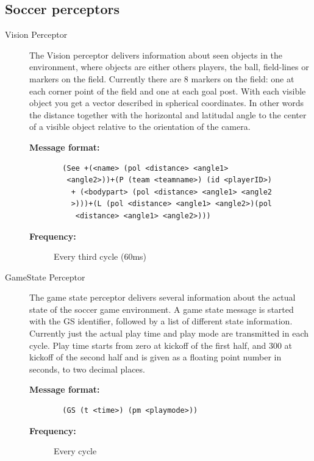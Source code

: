 \subsection{Soccer perceptors}
\begin{description}
  \item [Vision Perceptor]
  The Vision perceptor delivers information about seen objects in the environment, where objects are either others players, the ball, field-lines or markers on the field. Currently there are 8 markers on the field: one at each corner point of the field and one at each goal post. With each visible object you get a vector described in spherical coordinates. In other words the distance together with the horizontal and latitudal angle to the center of a visible object relative to the orientation of the camera.\cite{SimSpark}
 \begin{description}
  \item[{\bf Message format:}]
  \begin{verbatim}
  (See +(<name> (pol <distance> <angle1>
   <angle2>))+(P (team <teamname>) (id <playerID>)
    + (<bodypart> (pol <distance> <angle1> <angle2
    >)))+(L (pol <distance> <angle1> <angle2>)(pol
     <distance> <angle1> <angle2>)))
  \end{verbatim}
  \item[{\bf Frequency:}]
 Every third cycle (60ms)
  \end{description}


  \item [GameState Perceptor]
  The game state perceptor delivers several information about the actual state of the soccer game environment. A game state message is started with the GS identifier, followed by a list of different state information. Currently just the actual play time and play mode are transmitted in each cycle. Play time starts from zero at kickoff of the first half, and 300 at kickoff of the second half and is given as a floating point number in seconds, to two decimal places.\cite{SimSpark}
     \begin{description}
  \item[{\bf Message format:}]
  \begin{verbatim}
  (GS (t <time>) (pm <playmode>))
  \end{verbatim}
  \item[{\bf Frequency:}]
 Every cycle
  \end{description}






\end{description}
